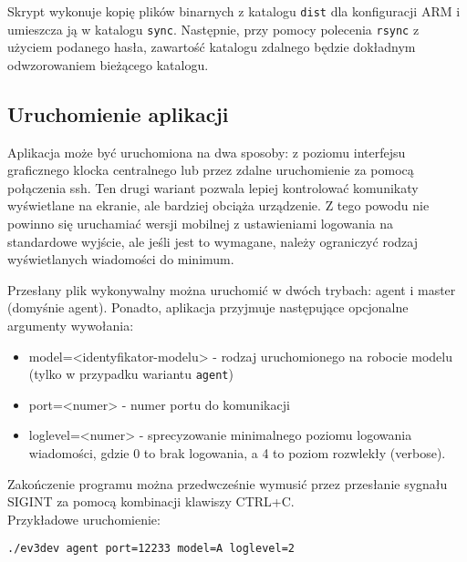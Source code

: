 Skrypt wykonuje kopię plików binarnych z katalogu {\tt dist} dla konfiguracji ARM i umieszcza ją w katalogu {\tt sync}. Następnie, przy pomocy polecenia {\tt rsync} z użyciem podanego hasła, zawartość katalogu zdalnego będzie dokładnym odwzorowaniem bieżącego katalogu.

\subsection{Uruchomienie aplikacji}

Aplikacja może być uruchomiona na dwa sposoby: z poziomu interfejsu graficznego klocka centralnego lub przez zdalne uruchomienie za pomocą połączenia ssh. Ten drugi wariant pozwala lepiej kontrolować komunikaty wyświetlane na ekranie, ale bardziej obciąża urządzenie. Z tego powodu nie powinno się uruchamiać wersji mobilnej z ustawieniami logowania na standardowe wyjście, ale jeśli jest to wymagane, należy ograniczyć rodzaj wyświetlanych wiadomości do minimum.

Przesłany plik wykonywalny można uruchomić w dwóch trybach: agent i master (domyśnie agent). Ponadto, aplikacja przyjmuje następujące opcjonalne argumenty wywołania:
\begin{itemize}
    \item model=<identyfikator-modelu> - rodzaj uruchomionego na robocie modelu (tylko w przypadku wariantu {\tt agent})
    \item port=<numer> - numer portu do komunikacji
    \item loglevel=<numer> - sprecyzowanie minimalnego poziomu logowania wiadomości, gdzie 0 to brak logowania, a 4 to poziom rozwlekły (verbose).
\end{itemize}

Zakończenie programu można przedwcześnie wymusić przez przesłanie sygnału SIGINT za pomocą kombinacji klawiszy CTRL+C.\\


Przykładowe uruchomienie:
\begin{center}
    {\tt ./ev3dev agent port=12233 model=A loglevel=2}
\end{center}
